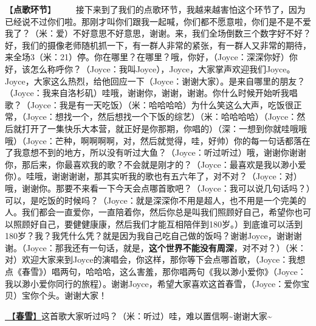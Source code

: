 \documentclass[]{ctexbook}
\begin{document}
【\textbf{点歌环节}】
  接下来到了我们的点歌环节，我越来越害怕这个环节了，因为已经说不过你们啦。那刚才叫你们跟我一起喊，你们都不愿意啦，你们是不是不爱我了？（米：爱）不好意思不好意思，谢谢。来，我们全场倒数三个数字好不好？好，我们的摄像老师随机抓一下，有一群人非常的紧张，有一群人又非常的期待，来全场3（米：21）停。你在哪里？在哪里？哦，你好，（Joyce：深深你好）你好，该怎么称呼你？（Joyce：我叫Joyce），Joyce，大家掌声欢迎我们Joyce。Joyce，大家这么热烈，给他回应一下（Joyce：谢谢大家）。是来自哪里的朋友？（Joyce：我来自洛杉矶）哇哦，谢谢你，谢谢，谢谢。你什么时候开始听我唱歌？（Joyce：我是有一天吃饭）（米：哈哈哈哈）为什么笑这么大声，吃饭很正常，（Joyce：想找一个，然后想找一个下饭的综艺）（米：哈哈哈哈）（Joyce：然后就打开了一集快乐大本营，就正好是你那期，你唱的）（深：一想到你就哇哦哦哦）（Joyce：芒种，啊啊啊啊，对，然后就觉得，哇，好帅）你的每一句话都落在了我意想不到的地方，所以没有听过大鱼？（Joyce：听过听过）哦，谢谢你谢谢你，那后来，你最喜欢我的歌？不会就是刚才的？（Joyce：最喜欢是我以渺小爱你）。哇哦，谢谢谢谢，那其实听我的歌也有五六年了，对不对？（Joyce：对）哦，谢谢你。那要不来看一下今天会点哪首歌吧？（Joyce：我可以说几句话吗？）可以，是吃饭的时候吗？（Joyce：就是深深你不用是超人，也不用是一个完美的人。我们都会一直爱你，一直陪着你，然后你总是叫我们照顾好自己，希望你也可以照顾好自己，要健健康康，然后我们才能互相陪伴到180岁。）到底谁可以活到180岁？我？我凭什么凭？就是因为我自己吃自己做的饭吗？谢谢Joyce，谢谢谢谢。（Joyce：那我还有一句话，就是，\textbf{这个世界不能没有周深}，对不对？）（米：对）欢迎大家来到Joyce的演唱会，你这样，那你等下会点哪首歌，（Joyce：我想点《春雪》）唱两句，哈哈哈，这么害羞，那你唱两句《我以渺小爱你》（Joyce：我以渺小爱你同行的旅程）。谢谢Joyce，希望大家喜欢这首春雪，（Joyce：爱你宝贝）宝你个头。谢谢大家！

\hyperref[spring-snow]{🎵【\textbf{春雪}】}这首歌大家听过吗？（米：听过）哇，难以置信啊\textasciitilde 谢谢大家\textasciitilde{}
\end{document}
